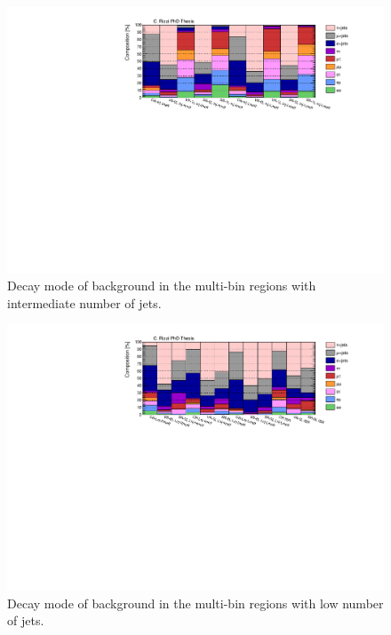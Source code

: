 \begin{figure}[htbp]
\includegraphics[width=\textwidth]{figures/strong_prod/comp_plots/Inj_tt.pdf}
\caption{Decay mode of \ttbar background in the multi-bin regions with intermediate number of jets.}
	\label{fig:ttcomp_Inj}
\end{figure}

\begin{figure}[htbp]
\includegraphics[width=\textwidth]{figures/strong_prod/comp_plots/Lnj_tt.pdf}
\caption{Decay mode of \ttbar background in the multi-bin regions with low number of jets.}
	\label{fig:ttcomp_Lnj}
\end{figure}




